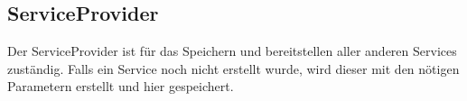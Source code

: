 \subsection{ServiceProvider}
Der ServiceProvider ist für das Speichern und bereitstellen aller anderen Services zuständig.
Falls ein Service noch nicht erstellt wurde, wird dieser mit den nötigen Parametern erstellt
und hier gespeichert.
